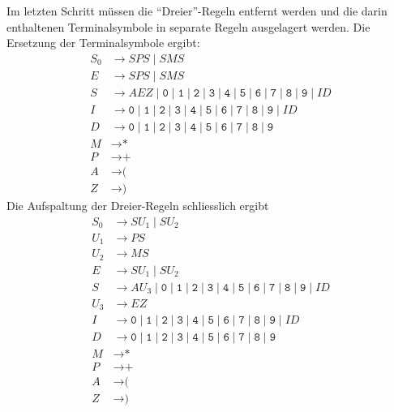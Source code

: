 \begin{loesung}
\begin{teilaufgaben}
Im letzten Schritt müssen die ``Dreier''-Regeln entfernt werden
und die darin enthaltenen Terminalsymbole in separate Regeln ausgelagert
werden.
Die Ersetzung der Terminalsymbole ergibt:
\begin{align*}
S_0&\to SPS \;|\; SMS \\
E&\to SPS \;|\; SMS \\
S&\to AEZ \;|\;
\texttt{0}
\;|\;
\texttt{1}
\;|\;
\texttt{2}
\;|\;
\texttt{3}
\;|\;
\texttt{4}
\;|\;
\texttt{5}
\;|\;
\texttt{6}
\;|\;
\texttt{7}
\;|\;
\texttt{8}
\;|\;
\texttt{9}
\;|\; I D \\
I&\to 
\texttt{0}
\;|\;
\texttt{1}
\;|\;
\texttt{2}
\;|\;
\texttt{3}
\;|\;
\texttt{4}
\;|\;
\texttt{5}
\;|\;
\texttt{6}
\;|\;
\texttt{7}
\;|\;
\texttt{8}
\;|\;
\texttt{9}
\;|\; I D \\
D&\to
\texttt{0}
\;|\;
\texttt{1}
\;|\;
\texttt{2}
\;|\;
\texttt{3}
\;|\;
\texttt{4}
\;|\;
\texttt{5}
\;|\;
\texttt{6}
\;|\;
\texttt{7}
\;|\;
\texttt{8}
\;|\;
\texttt{9}
\\
M&\to \texttt{*}\\
P&\to \texttt{+}\\
A&\to \texttt{(}\\
Z&\to \texttt{)}
\end{align*}
Die Aufspaltung der Dreier-Regeln schliesslich ergibt
\begin{align*}
S_0&\to SU_1 \;|\; SU_2 \\
U_1&\to PS \\
U_2&\to MS \\
E&\to SU_1 \;|\; SU_2 \\
S&\to AU_3 \;|\; 
\texttt{0}
\;|\;
\texttt{1}
\;|\;
\texttt{2}
\;|\;
\texttt{3}
\;|\;
\texttt{4}
\;|\;
\texttt{5}
\;|\;
\texttt{6}
\;|\;
\texttt{7}
\;|\;
\texttt{8}
\;|\;
\texttt{9}
\;|\; I D \\
U_3&\to EZ\\
I&\to 
\texttt{0}
\;|\;
\texttt{1}
\;|\;
\texttt{2}
\;|\;
\texttt{3}
\;|\;
\texttt{4}
\;|\;
\texttt{5}
\;|\;
\texttt{6}
\;|\;
\texttt{7}
\;|\;
\texttt{8}
\;|\;
\texttt{9}
\;|\; I D \\
D&\to
\texttt{0}
\;|\;
\texttt{1}
\;|\;
\texttt{2}
\;|\;
\texttt{3}
\;|\;
\texttt{4}
\;|\;
\texttt{5}
\;|\;
\texttt{6}
\;|\;
\texttt{7}
\;|\;
\texttt{8}
\;|\;
\texttt{9}
\\
M&\to \texttt{*}\\
P&\to \texttt{+}\\
A&\to \texttt{(}\\
Z&\to \texttt{)}
\end{align*}

\end{teilaufgaben}
\end{loesung}
